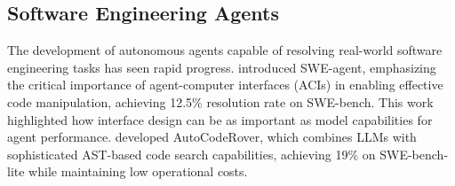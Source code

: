 \subsection{Software Engineering Agents}

The development of autonomous agents capable of resolving real-world software engineering tasks has seen rapid progress. \citet{yang2024sweagent} introduced SWE-agent, emphasizing the critical importance of agent-computer interfaces (ACIs) in enabling effective code manipulation, achieving 12.5\% resolution rate on SWE-bench. This work highlighted how interface design can be as important as model capabilities for agent performance. \citet{zhang2024autocoderover} developed AutoCodeRover, which combines LLMs with sophisticated AST-based code search capabilities, achieving 19\% on SWE-bench-lite while maintaining low operational costs.


 